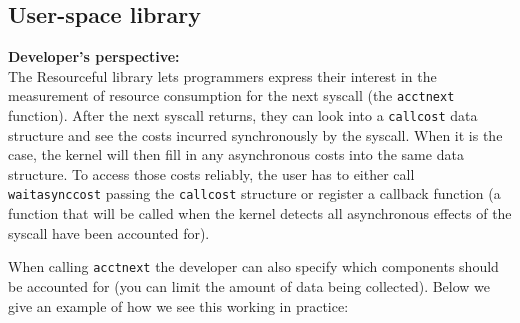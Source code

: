 \documentclass[12pt]{article}
\def\_{\textunderscore\-}
\begin{document}
\subsection{User-space library}
\textbf{Developer’s perspective:\\}
The Resourceful library lets programmers express their interest in the measurement of resource consumption for the next syscall (the \texttt{acct\_next} function). After the next syscall returns, they can look into a \texttt{call\_cost} data structure and see the costs incurred synchronously by the syscall. When it is the case, the kernel will then fill in any asynchronous costs into the same data structure. To access those costs reliably, the user has to either call \texttt{wait\_async\_cost} passing the \texttt{call\_cost} structure or register a callback function (a function that will be called when the kernel detects all asynchronous effects of the syscall have been accounted for).

When calling \texttt{acct\_next} the developer can also specify which components should be accounted for (you can limit the amount of data being collected). Below we give an example of how we see this working in practice:
\end{document}
